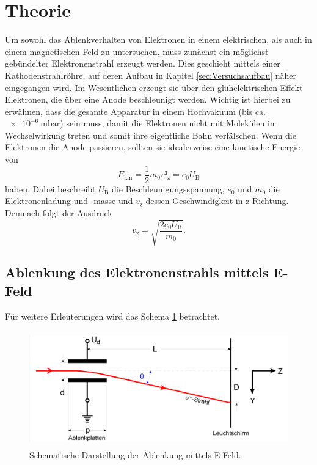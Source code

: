 \section{Theorie}
\label{sec:Theorie}

Um sowohl das Ablenkverhalten von Elektronen in einem elektrischen, als auch in einem magnetischen Feld zu untersuchen, muss zunächst ein möglichst gebündelter Elektronenstrahl erzeugt werden.
Dies geschieht mittels einer Kathodenstrahlröhre, auf deren Aufbau in Kapitel \ref{sec:Versuchsaufbau} näher eingegangen wird.
Im Wesentlichen erzeugt sie über den glühelektrischen Effekt Elektronen, die über eine Anode beschleunigt werden.
Wichtig ist hierbei zu erwähnen, dass die gesamte Apparatur in einem Hochvakuum (bis ca. $\SI{e-6}{\milli\bar}$) sein muss, damit die Elektronen nicht mit Molekülen in Wechselwirkung treten und somit ihre eigentliche Bahn verfälschen.
Wenn die Elektronen die Anode passieren, sollten sie idealerweise eine kinetische Energie von
\begin{equation}
  E_{\text{kin}} = \frac{1}{2}m_0 v²_{\text{z}} = e_0 U_{\text{B}}
\end{equation}
haben.
Dabei beschreibt $U_{\text{B}}$ die Beschleunigungsspannung, $e_0$ und $m_0$ die Elektronenladung und -masse und $v_{\text{z}}$ dessen Geschwindigkeit in z-Richtung.
Demnach folgt der Ausdruck
\begin{equation}
  v_{\text{z}} = \sqrt{\frac{2 e_0 U_{\text{B}}}{m_0}}. \label{eqn:1}
\end{equation}

\subsection{Ablenkung des Elektronenstrahls mittels E-Feld}
Für weitere Erleuterungen wird das Schema \ref{fig:1} betrachtet.

\begin{figure}
  \centering
  \includegraphics[height=5cm]{ressources/schema.png}
  \caption{Schematische Darstellung der Ablenkung mittels E-Feld. \cite{skript1}}
  \label{fig:1}
\end{figure}

